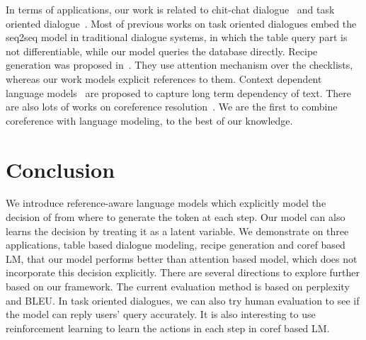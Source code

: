 \documentclass[11pt,letterpaper]{article}
\begin{document}
In terms of applications, our work is related to chit-chat
dialogue~\citep{li:2016, vinyals:2015, sordoni:2015, serban2016building,
  shang2015neural} and task oriented dialogue~\citep{wen:2016,
  bordes2016learning, williams2016end, wen2016network}. Most of previous works
on task oriented dialogues embed the seq2seq model in traditional dialogue
systems, in which the table query part is not differentiable, while our model
queries the database directly. Recipe generation was proposed
in~\citep{kiddon:2016}. They use attention mechanism over the checklists,
whereas our work models explicit references to them. Context dependent language
models~\citep{mikolov2010recurrent,
  jozefowicz2016exploring,mikolov2010recurrent, ji2015document, wang2015larger}
are proposed to capture long term dependency of text. There are also lots of
works on coreference resolution~\citep{haghighi2010coreference,
  wiseman2016learning}. We are the first to combine coreference with language
modeling, to the best of our knowledge.

\section{Conclusion}
We introduce reference-aware language models which explicitly model the
decision of from where to generate the token at each step. Our model can also
learns the decision by treating it as a latent variable. We demonstrate on
three applications, table based dialogue modeling, recipe generation and coref
based LM, that our model performs better than attention based model, which does
not incorporate this decision explicitly. There are several directions to
explore further based on our framework. The current evaluation method is based
on perplexity and BLEU. In task oriented dialogues, we can also try human
evaluation to see if the model can reply users' query accurately. 
It is also interesting to use reinforcement learning to learn the actions in
each step in coref based LM.




\appendix
\onecolumn
\end{document}

